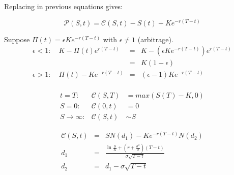 Replacing in previous equations gives:

\begin{equation*}
    \mathcal{P}(S,t) = \mathcal{C}(S,t) - S(t) + Ke^{-r(T-t)}
\end{equation*}

Suppose $\mathit{\Pi}(t) = \epsilon Ke^{-r(T-t)}$ with $\epsilon \neq 1$ (arbitrage).
\begin{eqnarray*}
    \epsilon < 1 : \quad K - \mathit{\Pi(t)}e^{r(T-t)} &=& K - (\epsilon Ke^{-r(T-t)})e^{r(T-t)} \\
                                  &=& K(1-\epsilon)\\
    \epsilon > 1 : \quad \mathit{\Pi}(t) - Ke^{-r(T-t)} &=& (\epsilon - 1)Ke^{-r(T-t)}\\
\end{eqnarray*}

\begin{eqnarray*}
    t = T:& \mathcal{C}(S, T) &= max\left(S(T) - K, 0 \right) \\
    S = 0:& \mathcal{C}(0, t) &= 0 \\
    S \xrightarrow{} \infty :& \mathcal{C}(S, t) & \sim S
\end{eqnarray*}


\begin{eqnarray*}
    \mathcal{C}(S, t) &=& S N(d_1) - K e^{-r\left( T-t \right)} N(d_2) \\
    d_1 &=& \frac{\ln \frac{S}{K} + \left( r + \frac{\sigma^2}{2} \right) \left( T - t \right)}{\sigma \sqrt{T - t}} \\
    d_2 &=& d_1 - \sigma \sqrt{T - t} \\
\end{eqnarray*}
